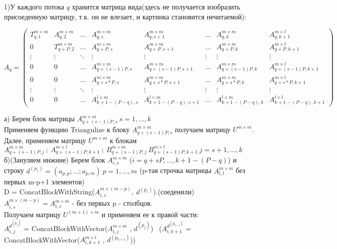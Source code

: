 \documentclass[a4paper,12pt]{article}
\begin{document}
1)У каждого потока $q$ хранится матрица вида(здесь не получается изобразить присоеденную матрицу, т.к. он не влезает, и картинка становится нечитаемой):

$$A_{q}=
   \begin{pmatrix}
     T_{q,1}^{m\times m}& A_{q,2}^{m\times m} &\dots & A_{q,s}^{m \times m} &  A_{q,s+1}^{m \times m}& \dots& A_{q,k}^{m\times m} & A_{q,k+1}^{m\times l}\\
     
     0& T_{q+P,2}^{m\times m} &\ldots & A_{q+P,s}^{m \times m} &  A_{q+P,s+1}^{m \times m}& \dots& A_{q+P,k}^{m\times m} & A_{q+P,k+1}^{m\times l} \\
     
     \vdots& \vdots &\ddots & \vdots & \vdots & \vdots & \vdots & \vdots  \\
     
     0& 0 &\ldots & A_{q+(s-1)P,s}^{m \times m} &  A_{q+(s-1)P,s+1}^{m \times m}& \dots& A_{q+(s-1)P,k}^{m\times m} & A_{q+(s-1)P,k+1}^{m\times l}\\

     0& 0 &\ldots & A_{q+s*P,s}^{m \times m} &  A_{q+s*P,s+1}^{m \times m}& \dots& A_{q+s*P,k}^{m\times m} & A_{q+s*P,k+1}^{m\times l}\\

    \vdots& \vdots &\ddots & \vdots & \vdots & \vdots & \vdots & \vdots  \\

    0& 0 &\ldots & A_{k+1-(P-q),s}^{l \times m} &  A_{k+1-(P-q),s+1}^{l \times m}& \dots& A_{k+1-(P-q),k}^{l\times m} & A_{k+1-(P-q),k+1}^{l\times l}
    \end{pmatrix}
$$ 

а) Берем блок матрицы  $A_{q+(s-1)P,s}^{m\times m} \ s = 1,...,k$\\
Применяем функцию Triangulize к блоку $A_{q+(s-1)P,s}^{m\times m} $ получаем матрицу $U^{m\times m}$. \\
Далее, применяем матрицу $U^{m\times m}$ к блокам $A_{q+(s-1)P,j}^{m\times m} \ ; \ A_{q+(s-1)P,k+1}^{m\times l} \ ; \ B_{q+(s-1)P,j}^{m\times m}\ B_{q+(s-1)P,k+1}^{m\times l} \ j = s+1,...,k$  \\


б)(Зануляем нижние) Берем блок $A_{i,s}^{{m\times m}}$ ($i = q+sP,...,k+1-(P-q)$) и строку $d^{(p_{1})} =(a_{p,p};...;a_{p,m}) \ p = 1,...,m$ (p-тая строчка матрицы $A_{l,l}^{m\times m}$ без первых m-p+1 элементов) \\
D = ConcatBlockWithString($A_{i,s}^{{m\times (m-p)}}, \ d^{(p_{1})}$).(соеденили) \
$A_{i,s}^{m\times (m-p)} = A_{i,s}^{m\times m}$ - без первых p - столбцов.\\
Получаем матрицу $U^{(m+1)\times m}$ и применяем ее к правой части:\\
$A_{i,j}^{d^{(p_{j})}}$ =  ConcatBlockWithVector($A_{i,j}^{m\times m}$ , $d^{(p_{j})}$) \ ($A_{i,k+1}^{d^{(p_{k+1})}} = $   ConcatBlockWithVector($A_{i,k+1}^{m\times l}$ , $d^{(p_{k+1})}$)) \\
\end{document}

